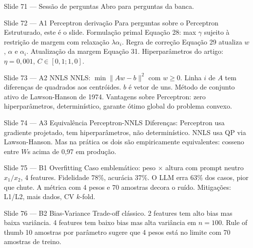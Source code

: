 \documentclass[aspectratio=169,10pt]{beamer}
\begin{document}
\begin{frame}{Slide 71 --- Sess\~ao de perguntas}
\footnotesize
Abro para perguntas da banca.
\end{frame}

\begin{frame}{Slide 72 --- A1 Perceptron deriva\c{c}\~ao}
\footnotesize
Para perguntas sobre o Perceptron Estruturado, este \'e o slide. Formula\c{c}\~ao primal Equa\c{c}\~ao 28: max $\gamma$ sujeito \`a restri\c{c}\~ao de margem com relaxa\c{c}\~ao $\lambda \alpha_i$. Regra de corre\c{c}\~ao Equa\c{c}\~ao 29 atualiza $w$, $\alpha$ e $\alpha_i$. Atualiza\c{c}\~ao da margem Equa\c{c}\~ao 31. Hiperpar\^ametros do artigo: $\eta=0{,}001$, $C \in [0{,}1; 1{,}0]$.
\end{frame}

\begin{frame}{Slide 73 --- A2 NNLS}
\footnotesize
NNLS: $\min \|Aw - b\|^2$ com $w \geq 0$. Linha $i$ de $A$ tem diferen\c{c}as de quadrados aos centr\'oides. $b$ \'e vetor de uns. M\'etodo de conjunto ativo de Lawson-Hanson de 1974. Vantagens sobre Perceptron: zero hiperpar\^ametros, determin\'istico, garante \'otimo global do problema convexo.
\end{frame}

\begin{frame}{Slide 74 --- A3 Equival\^encia Perceptron-NNLS}
\footnotesize
Diferen\c{c}as: Perceptron usa gradiente projetado, tem hiperpar\^ametros, n\~ao determin\'istico. NNLS usa QP via Lawson-Hanson. Mas na pr\'atica os dois s\~ao empiricamente equivalentes: cosseno entre $W$s acima de 0{,}97 em produ\c{c}\~ao.
\end{frame}

\begin{frame}{Slide 75 --- B1 Overfitting}
\footnotesize
Caso emblem\'atico: peso $\times$ altura com prompt neutro $x_1/x_2$, 4 features. Fidelidade 78\%, acur\'acia 37\%. O LLM erra 63\% dos casos, pior que chute. A m\'etrica com 4 pesos e 70 amostras decora o ru\'ido. Mitiga\c{c}\~oes: L1/L2, mais dados, CV $k$-fold.
\end{frame}

\begin{frame}{Slide 76 --- B2 Bias-Variance}
\footnotesize
Trade-off cl\'assico. 2 features tem alto bias mas baixa vari\^ancia. 4 features tem baixo bias mas alta vari\^ancia em $n=100$. Rule of thumb 10 amostras por par\^ametro sugere que 4 pesos est\'a no limite com 70 amostras de treino.
\end{frame}
\end{document}

